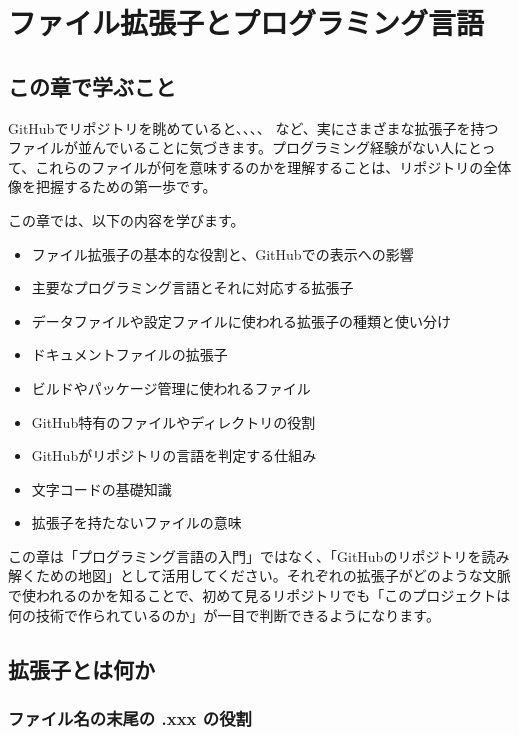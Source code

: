 \chapter{ファイル拡張子とプログラミング言語}

\section{この章で学ぶこと}

GitHubでリポジトリを眺めていると、、、、 など、実にさまざまな拡張子を持つファイルが並んでいることに気づきます。プログラミング経験がない人にとって、これらのファイルが何を意味するのかを理解することは、リポジトリの全体像を把握するための第一歩です。

この章では、以下の内容を学びます。

\begin{itemize}
  \item ファイル拡張子の基本的な役割と、GitHubでの表示への影響
  \item 主要なプログラミング言語とそれに対応する拡張子
  \item データファイルや設定ファイルに使われる拡張子の種類と使い分け
  \item ドキュメントファイルの拡張子
  \item ビルドやパッケージ管理に使われるファイル
  \item GitHub特有のファイルやディレクトリの役割
  \item GitHubがリポジトリの言語を判定する仕組み
  \item 文字コードの基礎知識
  \item 拡張子を持たないファイルの意味
\end{itemize}

この章は「プログラミング言語の入門」ではなく、「GitHubのリポジトリを読み解くための地図」として活用してください。それぞれの拡張子がどのような文脈で使われるのかを知ることで、初めて見るリポジトリでも「このプロジェクトは何の技術で作られているのか」が一目で判断できるようになります。

\section{拡張子とは何か}

\subsection{ファイル名の末尾の .xxx の役割}

